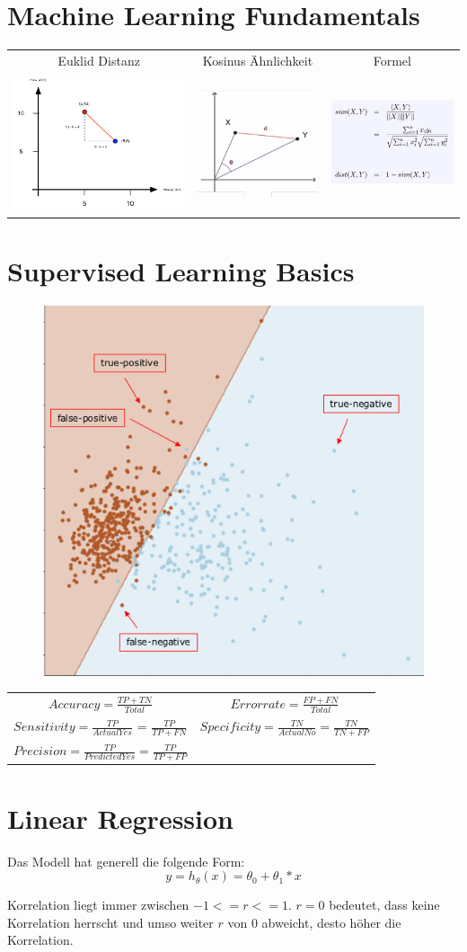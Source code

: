 \documentclass[left=1cm, right=1cm, top=1cm, bottom=1cm]{report}
\begin{document}
\section{Machine Learning Fundamentals}
	\begin{tabular}{c c c}
	  Euklid Distanz & Kosinus Ähnlichkeit & Formel\\
    	  \includegraphics[width=0.25\linewidth]{euclide_distance.png} & \includegraphics[width=0.25\linewidth]{cosine_similarity.png} & \includegraphics[width=0.25\linewidth]{cosine_similarity_formula.png} \\
	\end{tabular}
\section{Supervised Learning Basics}
\begin{figure}[H]
	\includegraphics[width=0.5\linewidth]{true_positive}
\end{figure}
\begin{tabular}{c c}
	$Accuracy = \frac{TP + TN}{Total}$ & 	$Errorrate = \frac{FP + FN}{Total}$ \\
	$Sensitivity = \frac{TP}{Actual Yes}$ = $\frac{TP}{TP + FN}$ & $Specificity = \frac{TN}{ActualNo} = \frac{TN}{TN + FP}$ \\
	$Precision = \frac{TP}{Predicted Yes} = \frac{TP}{TP + FP}$
\end{tabular}
\section{Linear Regression}
	Das Modell hat generell die folgende Form:
	$$y = h_\theta(x) = \theta_0 + \theta_1 * x$$

	Korrelation liegt immer zwischen $-1 <= r <= 1$.
	$r = 0$ bedeutet, dass keine Korrelation herrscht und umso weiter $r$ von $0$ abweicht, 
	desto höher die Korrelation.
\end{document}
